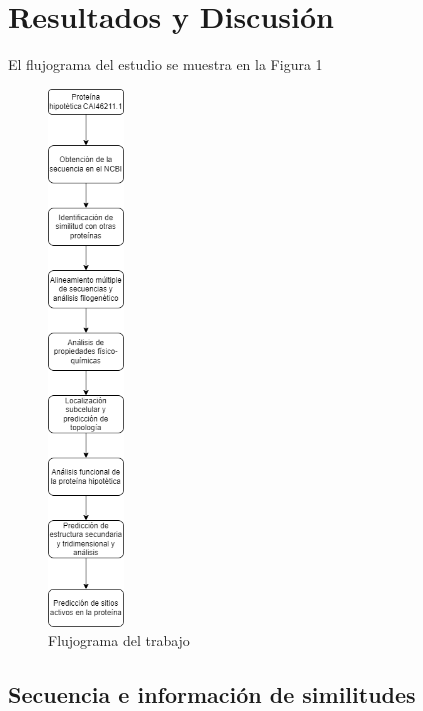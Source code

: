 \documentclass[journal,transmag]{IEEEtran}
\begin{document}
\section{Resultados y Discusión}
El flujograma del estudio se muestra en la Figura 1
	\begin{figure}[!h]
		\center
		\includegraphics[width=2cm]{imagenes/flujograma.png}
		\caption{Flujograma del trabajo}
		\label{1}
	\end{figure}

\subsection{\textbf{ Secuencia e información de similitudes}}
\end{document}
